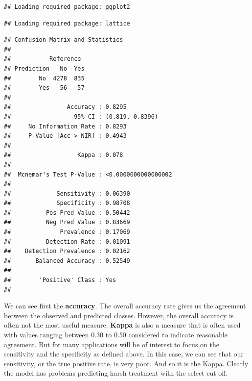 \documentclass[
]{book}
\newenvironment{Shaded}{\begin{snugshade}}{\end{snugshade}}
\newcommand{\AttributeTok}[1]{\textcolor[rgb]{0.77,0.63,0.00}{#1}}
\newcommand{\CommentTok}[1]{\textcolor[rgb]{0.56,0.35,0.01}{\textit{#1}}}
\newcommand{\FunctionTok}[1]{\textcolor[rgb]{0.00,0.00,0.00}{#1}}
\newcommand{\NormalTok}[1]{#1}
\newcommand{\SpecialCharTok}[1]{\textcolor[rgb]{0.00,0.00,0.00}{#1}}
\newcommand{\StringTok}[1]{\textcolor[rgb]{0.31,0.60,0.02}{#1}}
\begin{document}
\begin{verbatim}
## Loading required package: ggplot2
\end{verbatim}

\begin{verbatim}
## Loading required package: lattice
\end{verbatim}

\begin{Shaded}
\end{Shaded}

\begin{verbatim}
## Confusion Matrix and Statistics
## 
##           Reference
## Prediction   No  Yes
##        No  4278  835
##        Yes   56   57
##                                              
##                Accuracy : 0.8295             
##                  95% CI : (0.819, 0.8396)    
##     No Information Rate : 0.8293             
##     P-Value [Acc > NIR] : 0.4943             
##                                              
##                   Kappa : 0.078              
##                                              
##  Mcnemar's Test P-Value : <0.0000000000000002
##                                              
##             Sensitivity : 0.06390            
##             Specificity : 0.98708            
##          Pos Pred Value : 0.50442            
##          Neg Pred Value : 0.83669            
##              Prevalence : 0.17069            
##          Detection Rate : 0.01091            
##    Detection Prevalence : 0.02162            
##       Balanced Accuracy : 0.52549            
##                                              
##        'Positive' Class : Yes                
## 
\end{verbatim}

We can see first the \textbf{accuracy}. The overall accuracy rate gives us the agreement between the observed and predicted classes. However, the overall accuracy is often not the most useful measure. \textbf{Kappa} is also a measure that is often used with values ranging between 0.30 to 0.50 considered to indicate reasonable agreement. But for many applications will be of interest to focus on the sensitivity and the specificity as defined above. In this case, we can see that our sensitivity, or the true positive rate, is very poor. And so it is the Kappa. Clearly the model has problems predicting harsh treatment with the select cut off.
\end{document}
